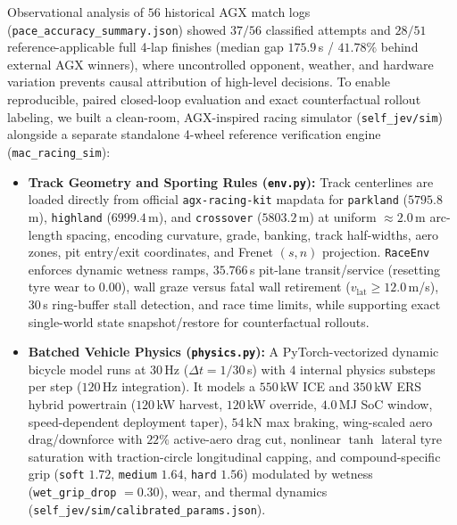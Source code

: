 \documentclass[11pt,a4paper]{article}
\begin{document}
Observational analysis of $56$ historical AGX match logs (\texttt{pace\_accuracy\_summary.json}) showed $37/56$ classified attempts and $28/51$ reference-applicable full 4-lap finishes (median gap $175.9$\,s / $41.78\%$ behind external AGX winners), where uncontrolled opponent, weather, and hardware variation prevents causal attribution of high-level decisions. To enable reproducible, paired closed-loop evaluation and exact counterfactual rollout labeling, we built a clean-room, AGX-inspired racing simulator (\texttt{self\_jev/sim}) alongside a separate standalone 4-wheel reference verification engine (\texttt{mac\_racing\_sim}):
\begin{itemize}[leftmargin=1.5em,itemsep=2pt]
  \item \textbf{Track Geometry and Sporting Rules (\texttt{env.py}):} Track centerlines are loaded directly from official \texttt{agx-racing-kit} mapdata for \texttt{parkland} ($5795.8$\,m), \texttt{highland} ($6999.4$\,m), and \texttt{crossover} ($5803.2$\,m) at uniform $\approx 2.0$\,m arc-length spacing, encoding curvature, grade, banking, track half-widths, aero zones, pit entry/exit coordinates, and Frenet $(s, n)$ projection. \texttt{RaceEnv} enforces dynamic wetness ramps, $35.766$\,s pit-lane transit/service (resetting tyre wear to $0.00$), wall graze versus fatal wall retirement ($v_{\text{lat}} \ge 12.0$\,m/s), 30\,s ring-buffer stall detection, and race time limits, while supporting exact single-world state snapshot/restore for counterfactual rollouts.
  \item \textbf{Batched Vehicle Physics (\texttt{physics.py}):} A PyTorch-vectorized dynamic bicycle model runs at $30$\,Hz ($\Delta t = 1/30$\,s) with $4$ internal physics substeps per step ($120$\,Hz integration). It models a $550$\,kW ICE and $350$\,kW ERS hybrid powertrain ($120$\,kW harvest, $120$\,kW override, $4.0$\,MJ SoC window, speed-dependent deployment taper), $54$\,kN max braking, wing-scaled aero drag/downforce with $22\%$ active-aero drag cut, nonlinear $\tanh$ lateral tyre saturation with traction-circle longitudinal capping, and compound-specific grip (\texttt{soft} $1.72$, \texttt{medium} $1.64$, \texttt{hard} $1.56$) modulated by wetness (\texttt{wet\_grip\_drop} $= 0.30$), wear, and thermal dynamics (\texttt{self\_jev/sim/calibrated\_params.json}).

\end{itemize}
\end{document}
